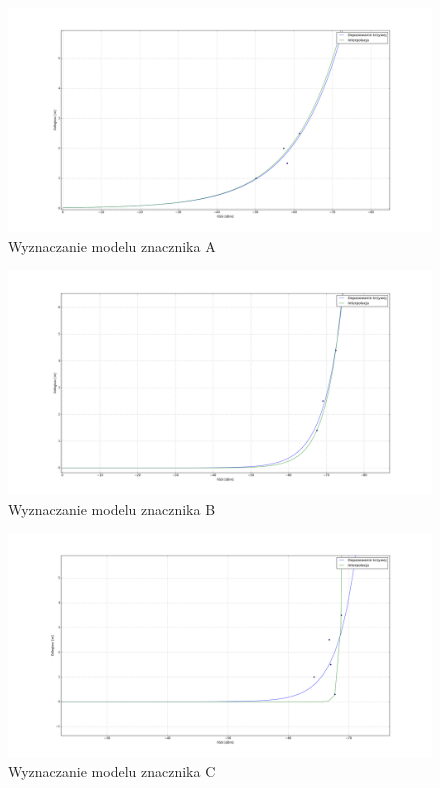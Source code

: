 \begin{figure}[H]
\centering
\includegraphics[width=1\textwidth]{img/strojenie-a.png}
\caption{Wyznaczanie modelu znacznika A}
\label{fig:strojenie-a}
\end{figure}

\begin{figure}[H]
\centering
\includegraphics[width=1\textwidth]{img/strojenie-b.png}
\caption{Wyznaczanie modelu znacznika B}
\label{fig:strojenie-b}
\end{figure}

\begin{figure}[H]
\centering
\includegraphics[width=1\textwidth]{img/strojenie-c.png}
\caption{Wyznaczanie modelu znacznika C}
\label{fig:strojenie-c}
\end{figure}

